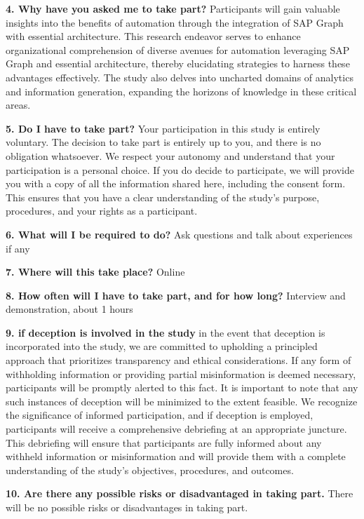 \documentclass{article}
\begin{document}
\textbf{4.	Why have you asked me to take part?} Participants will gain valuable insights into the benefits of automation through the integration of SAP Graph with essential architecture. This research endeavor serves to enhance organizational comprehension of diverse avenues for automation leveraging SAP Graph and essential architecture, thereby elucidating strategies to harness these advantages effectively. The study also delves into uncharted domains of analytics and information generation, expanding the horizons of knowledge in these critical areas.

\textbf{5.	Do I have to take part?} Your participation in this study is entirely voluntary. The decision to take part is entirely up to you, and there is no obligation whatsoever. We respect your autonomy and understand that your participation is a personal choice. If you do decide to participate, we will provide you with a copy of all the information shared here, including the consent form. This ensures that you have a clear understanding of the study's purpose, procedures, and your rights as a participant.

\textbf{6.	What will I be required to do?} Ask questions and talk about experiences if any

\textbf{7.	Where will this take place?} Online

\textbf{8.	How often will I have to take part, and for how long?} Interview and demonstration, about 1 hours

\textbf{9. if deception is involved in the study} in the event that deception is incorporated into the study, we are committed to upholding a principled approach that prioritizes transparency and ethical considerations. If any form of withholding information or providing partial misinformation is deemed necessary, participants will be promptly alerted to this fact. It is important to note that any such instances of deception will be minimized to the extent feasible. We recognize the significance of informed participation, and if deception is employed, participants will receive a comprehensive debriefing at an appropriate juncture. This debriefing will ensure that participants are fully informed about any withheld information or misinformation and will provide them with a complete understanding of the study's objectives, procedures, and outcomes.

\textbf{10.	Are there any possible risks or disadvantaged in taking part.} There will be no possible risks or disadvantages in taking part.
\end{document}
